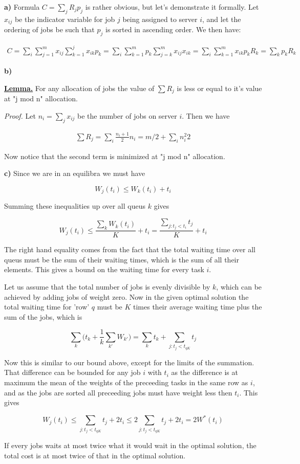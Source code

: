
\textbf{a)} Formula $C=\sum_j R_j p_j$ is rather obvious, but let's demonstrate it formally. Let $x_{ij}$ be the indicator variable for job $j$ being assigned to server $i$, and let the ordering of jobs be such that $p_j$ is sorted in ascending order. We then have:

\begin{align*}
C = \sum_i \sum_{j=1}^m x_{ij}\sum_{k=1}^j x_{ik}p_k = \sum_i \sum_{k=1}^m p_k \sum_{j=k}^m x_{ij}x_{ik} = \sum_i \sum_{k=1}^m x_{ik} p_k R_k = \sum_k p_k R_k
\end{align*}

\textbf{b)}

\uline{\textbf{Lemma.}} For any allocation of jobs the value of $\sum R_j$ is less or equal to it's value at "j mod n" allocation. 

\textit{Proof.} Let $n_i=\sum_j x_{ij}$ be the number of jobs on server $i$. Then we have

\begin{align*}
\sum R_j = \sum_i \frac{n_i+1}{2} n_i = m/2 + \sum_i {n_i^2}{2}
\end{align*}

Now notice that the second term is minimized at "j mod n" allocation. 

\textbf{c)} Since we are in an equilibra we must have

$$
W_j(t_i) \le W_k(t_i) + t_i
$$

Summing these inequalities up over all queus $k$ gives

$$
W_j(t_i) \le \frac{\sum_k W_k(t_i)}{K} + t_i = \frac{\sum_{j: t_j < t_i}  t_j}{K} + t_i 
$$

The right hand equality comes from the fact that the total waiting time over all queus must be the sum of their waiting times, which is the sum of all their elements. This gives a bound on the waiting time for every task $i$. 

Let us assume that the total number of jobs is evenly divisible by $k$, which can be achieved by adding jobs of weight zero. Now in the given optimal solution the total waiting time for 'row' $q$ must be $K$ times their average waiting time plus the sum of the jobs, which is

$$
\sum_k \bigg( t_k + \frac{1}{k} \sum_{k'} W_{k'} \bigg) = \sum_k t_k +  \sum_{j: t_j < t_{qK}}  t_j 
$$

Now this is similar to our bound above, except for the limits of the summation. That difference can be bounded for any job $i$ with $t_i$ as the difference is at maximum the mean of the weights of the preceeding tasks in the same row as $i$, and as the jobs are sorted all preceeding jobs must have weight less then $t_i$. This gives 

$$
W_j(t_i) \le \sum_{j: t_j < t_{qK}}  t_j  + 2 t_i \le 2 \sum_{j: t_j < t_{qK}}  t_j  + 2 t_i = 2 W^*(t_i)
$$

If every jobs waits at most twice what it would wait in the optimal solution, the total cost is at most twice of that in the optimal solution.
